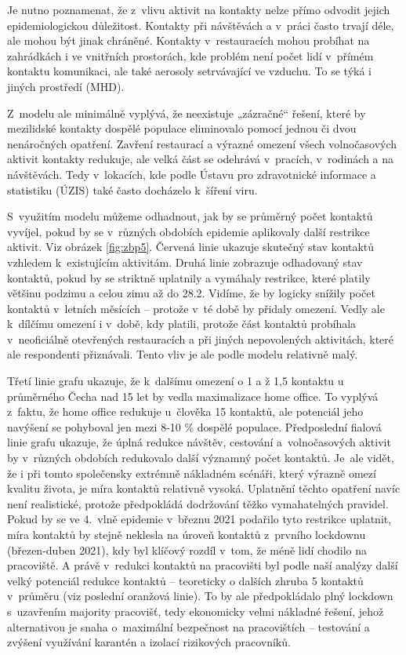 Je nutno poznamenat, že z vlivu aktivit na kontakty nelze přímo odvodit jejich epidemiologickou důležitost. Kontakty při návštěvách a v práci často trvají déle, ale mohou být jinak chráněné. Kontakty v restauracích mohou probíhat na zahrádkách i ve vnitřních prostorách, kde problém není počet lidí v přímém kontaktu komunikaci, ale také aerosoly setrvávající ve vzduchu. To se týká i jiných prostředí (MHD). 

Z modelu ale minimálně vyplývá, že neexistuje „zázračné“ řešení, které by mezilidské kontakty dospělé populace eliminovalo pomocí jednou či dvou nenáročných opatření. Zavření restaurací a výrazné omezení všech volnočasových aktivit kontakty redukuje, ale velká část se odehrává v pracích, v rodinách a na návštěvách. Tedy v lokacích, kde podle Ústavu pro zdravotnické informace a statistiku (ÚZIS) také často docházelo k šíření viru.

S využitím modelu můžeme odhadnout, jak by se průměrný počet kontaktů vyvíjel, pokud by se v různých obdobích epidemie aplikovaly další restrikce aktivit. Viz obrázek \ref{fig:zbp5}. Červená linie ukazuje skutečný stav kontaktů vzhledem k existujícím aktivitám. Druhá linie zobrazuje odhadovaný stav kontaktů, pokud by se striktně uplatnily a vymáhaly restrikce, které platily většinu podzimu a celou zimu až do 28.2. Vidíme, že by logicky snížily počet kontaktů v letních měsících – protože v té době by přidaly omezení. Vedly ale k dílčímu omezení i v době, kdy platili, protože část kontaktů probíhala v neoficiálně otevřených restauracích a při jiných nepovolených aktivitách, které ale respondenti přiznávali. Tento vliv je ale podle modelu relativně malý. 

Třetí linie grafu ukazuje, že k dalšímu omezení o 1 a ž 1,5 kontaktu u průměrného Čecha nad 15 let by vedla maximalizace home office. To vyplývá z faktu, že home office redukuje u člověka 15 kontaktů, ale potenciál jeho navýšení se pohyboval jen mezi 8-10 \% dospělé populace. Předposlední fialová linie grafu ukazuje, že úplná redukce návštěv, cestování a volnočasových aktivit by v různých obdobích redukovalo další významný počet kontaktů. Je ale vidět, že i při tomto společensky extrémně nákladném scénáři, který výrazně omezí kvalitu života, je míra kontaktů relativně vysoká. Uplatnění těchto opatření navíc není realistické, protože předpokládá dodržování těžko vymahatelných pravidel. Pokud by se ve 4. vlně epidemie v březnu 2021 podařilo tyto restrikce uplatnit, míra kontaktů by stejně neklesla na úroveň kontaktů z prvního lockdownu (březen-duben 2021), kdy byl klíčový rozdíl v tom, že méně lidí chodilo na pracoviště. A právě v redukci kontaktů na pracovišti byl podle naší analýzy další velký potenciál redukce kontaktů – teoreticky o dalších zhruba 5 kontaktů v průměru (viz poslední oranžová linie). To by ale předpokládalo plný lockdown s uzavřením majority pracovišť, tedy ekonomicky velmi nákladné řešení, jehož alternativou je snaha o maximální bezpečnost na pracovištích – testování a zvýšení využívání karantén a izolací rizikových pracovníků.

